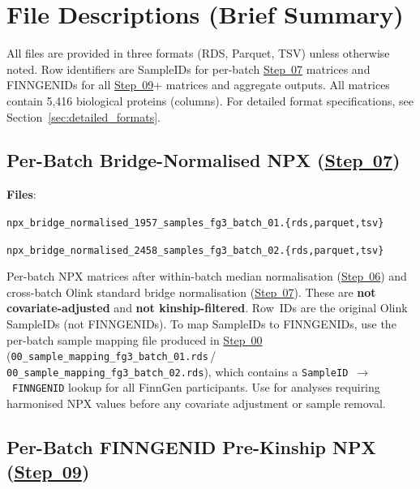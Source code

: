 \documentclass[11pt,a4paper]{article}
\begin{document}
\newpage
\tableofcontents
\newpage

\section{File Descriptions (Brief Summary)}
\label{sec:files}

All files are provided in three formats (RDS, Parquet, TSV) unless otherwise
noted. Row identifiers are SampleIDs for per-batch \href{https://github.com/FINNGEN/FinnGen3-proteomics-pipeline#pipeline-steps}{Step~07} matrices and
FINNGENIDs for all \href{https://github.com/FINNGEN/FinnGen3-proteomics-pipeline#pipeline-steps}{Step~09}+ matrices and aggregate outputs. All matrices
contain 5,416 biological proteins (columns). For detailed format
specifications, see Section~\ref{sec:detailed_formats}.

\subsection{Per-Batch Bridge-Normalised NPX (\href{https://github.com/FINNGEN/FinnGen3-proteomics-pipeline#pipeline-steps}{Step~07})}

\textbf{Files}:\par\noindent
\texttt{npx\_bridge\_normalised\_1957\_samples\_fg3\_batch\_01.\allowbreak\{rds,parquet,tsv\}}\par\noindent
\texttt{npx\_bridge\_normalised\_2458\_samples\_fg3\_batch\_02.\allowbreak\{rds,parquet,tsv\}}

Per-batch NPX matrices after within-batch median normalisation (\href{https://github.com/FINNGEN/FinnGen3-proteomics-pipeline#pipeline-steps}{Step~06}) and
cross-batch Olink standard bridge normalisation (\href{https://github.com/FINNGEN/FinnGen3-proteomics-pipeline#pipeline-steps}{Step~07}). These are
\textbf{not covariate-adjusted} and \textbf{not kinship-filtered}. Row~IDs
are the original Olink SampleIDs (not FINNGENIDs). To map SampleIDs to
FINNGENIDs, use the per-batch sample mapping file produced in \href{https://github.com/FINNGEN/FinnGen3-proteomics-pipeline#pipeline-steps}{Step~00}
(\texttt{00\_sample\_mapping\_fg3\_batch\_01.rds}\,/\,%
\texttt{00\_sample\_mapping\_fg3\_batch\_02.rds}), which contains a
\texttt{SampleID}~$\to$~\texttt{FINNGENID} lookup for all FinnGen
participants. Use for analyses requiring harmonised NPX values before any
covariate adjustment or sample removal.

\subsection{Per-Batch FINNGENID Pre-Kinship NPX (\href{https://github.com/FINNGEN/FinnGen3-proteomics-pipeline#pipeline-steps}{Step~09})}
\end{document}
